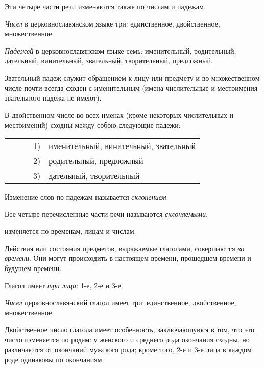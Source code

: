 \documentclass[11pt,a4paper,oneside]{memoir}
\begin{document}
    Эти четыре части речи изменяются также по числам и падежам.

    \emph{Чисел} в церковнославянском языке три: единственное, двойственное, множественное.
    
    \emph{Падежей} в церковнославянском языке семь: именительный, родительный, дательный, винительный, звательный, творительный, предложный.
    
    Звательный падеж служит обращением к лицу или предмету и во множественном числе почти всегда сходен с именительным (имена числительные и местоимения звательного падежа не имеют).
    
    В двойственном числе во всех именах (кроме некоторых числительных и местоимений) сходны между собою следующие падежи:
    
    \begin{flushleft}
        \renewcommand*{\arraystretch}{1.0}
        \begin{tabular}[l]{cll}
            
            ~~~~ & 1) & именительный, винительный, звательный\\
            ~~~~ & 2) & родительный, предложный\\
            ~~~~ & 3) & дательный, творительный\\
            
        \end{tabular}
    \end{flushleft}

    Изменение слов по падежам называется \emph{склонением}.
    
    Все четыре перечисленные части речи называются \emph{склоняемыми}.
    
    {} изменяется по временам, лицам и числам.
    
    Действия или состояния предметов, выражаемые глаголами, совершаются \emph{во времени}. Они могут происходить в настоящем времени, прошедшем времени и будущем времени.
    
    Глагол имеет \emph{три лица}: 1-е, 2-е и 3-е.
    
    \emph{Чисел} церковнославянский глагол имеет три: единственное, двойственное, множественное.
    
    Двойственное число глагола имеет особенность, заключающуюся в том, что это число изменяется по родам: у женского и среднего рода окончания сходны, но различаются от окончаний мужского рода; кроме того, 2-е и 3-е лица в каждом роде одинаковы по окончаниям.
    
\end{document}
